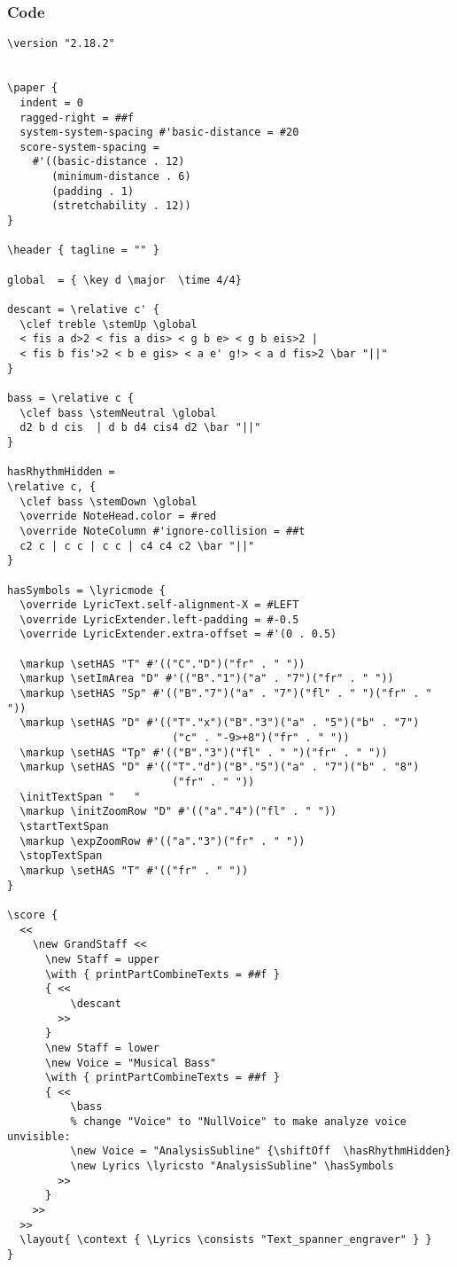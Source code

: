 \documentclass[
  DIV=calc,
  BCOR=5mm,
  12pt,
  headings=small,
  oneside,
  abstract=true,
  toc=bib,
  xcolor=dvipsnames,
  openany,
  ngerman,english]{scrartcl}
\begin{document}
\subsubsection{Code}
\begin{scriptsize}
\begin{verbatim}
\version "2.18.2"


\paper {
  indent = 0
  ragged-right = ##f
  system-system-spacing #'basic-distance = #20
  score-system-spacing =
    #'((basic-distance . 12)
       (minimum-distance . 6)
       (padding . 1)
       (stretchability . 12))
}

\header { tagline = "" }

global  = { \key d \major  \time 4/4}

descant = \relative c' {
  \clef treble \stemUp \global
  < fis a d>2 < fis a dis> < g b e> < g b eis>2 | 
  < fis b fis'>2 < b e gis> < a e' g!> < a d fis>2 \bar "||"
}

bass = \relative c {
  \clef bass \stemNeutral \global
  d2 b d cis  | d b d4 cis4 d2 \bar "||"
}

hasRhythmHidden =
\relative c, {
  \clef bass \stemDown \global
  \override NoteHead.color = #red
  \override NoteColumn #'ignore-collision = ##t
  c2 c | c c | c c | c4 c4 c2 \bar "||"
}

hasSymbols = \lyricmode {
  \override LyricText.self-alignment-X = #LEFT
  \override LyricExtender.left-padding = #-0.5
  \override LyricExtender.extra-offset = #'(0 . 0.5)

  \markup \setHAS "T" #'(("C"."D")("fr" . " "))
  \markup \setImArea "D" #'(("B"."1")("a" . "7")("fr" . " "))
  \markup \setHAS "Sp" #'(("B"."7")("a" . "7")("fl" . " ")("fr" . " "))
  \markup \setHAS "D" #'(("T"."x")("B"."3")("a" . "5")("b" . "7")
                          ("c" . "-9>+8")("fr" . " "))
  \markup \setHAS "Tp" #'(("B"."3")("fl" . " ")("fr" . " ")) 
  \markup \setHAS "D" #'(("T"."d")("B"."5")("a" . "7")("b" . "8")
                          ("fr" . " "))    
  \initTextSpan "   "
  \markup \initZoomRow "D" #'(("a"."4")("fl" . " "))
  \startTextSpan
  \markup \expZoomRow #'(("a"."3")("fr" . " ")) 
  \stopTextSpan
  \markup \setHAS "T" #'(("fr" . " "))
}

\score {
  <<
    \new GrandStaff <<
      \new Staff = upper
      \with { printPartCombineTexts = ##f }
      { <<
          \descant 
        >>
      }
      \new Staff = lower
      \new Voice = "Musical Bass"
      \with { printPartCombineTexts = ##f }
      { <<
          \bass
          % change "Voice" to "NullVoice" to make analyze voice unvisible:
          \new Voice = "AnalysisSubline" {\shiftOff  \hasRhythmHidden}
          \new Lyrics \lyricsto "AnalysisSubline" \hasSymbols
        >>
      }
    >>
  >>
  \layout{ \context { \Lyrics \consists "Text_spanner_engraver" } }
} 
\end{verbatim}
\end{scriptsize}
\end{document}
